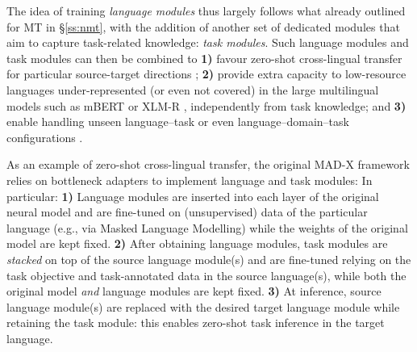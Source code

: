 \documentclass[10pt]{article} %
\begin{document}
The idea of training \textit{language modules} thus largely follows what already outlined for MT in \S\ref{ss:nmt}, with the addition of another set of dedicated modules that aim to capture task-related knowledge: \textit{task modules}. Such language modules and task modules can then be combined to \textbf{1)} favour zero-shot cross-lingual transfer for particular source-target directions \citep{pfeiffer-etal-2020-mad,Ansell2021MADG,ansell2021composable,Parovic2022BADX}; \textbf{2)} provide extra capacity to low-resource languages under-represented (or even not covered) in the large multilingual models such as mBERT or XLM-R \citep{Pfeiffer2021UNKs,Pfeiffer2022Lifting,ponti-etal-2020-xcopa,Faisal:2022arxiv}, independently from task knowledge; and \textbf{3)} enable handling unseen language--task or even language--domain--task configurations \citep{ponti-etal-2021-parameter,Stickland2021MultilingualDomainAdapt}. 

 


As an example of zero-shot cross-lingual transfer, the original MAD-X framework \citep[Figure~\ref{fig:CaseStudy:MADX}]{pfeiffer-etal-2020-mad} relies on bottleneck adapters to implement language and task modules: In particular: \textbf{1)} Language modules are inserted into each layer of the original neural model and are fine-tuned on (unsupervised) data of the particular language (e.g., via Masked Language Modelling) while the weights of the original model are kept fixed. \textbf{2)} After obtaining language modules, task modules are \textit{stacked} on top of the source language module(s) and are fine-tuned relying on the task objective and task-annotated data in the source language(s), while both the original model \textit{and} language modules are kept fixed. \textbf{3)} At inference, source language module(s) are replaced with the desired target language module while retaining the task module: this enables zero-shot task inference in the target language.
\end{document}
